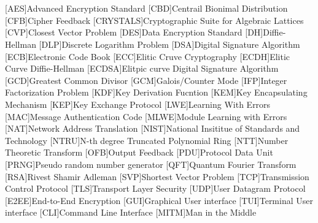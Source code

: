 \cleardoublepage
\chapter*{\listofabbrevname}
{}

\begin{acronym}[mmmmmmm]
	[AES]{Advanced Encryption Standard}
	[CBD]{Centrail Bionimal Distribution}
	[CFB]{Cipher Feedback}
	[CRYSTALS]{Cryptographic Suite for Algebraic Lattices}
	[CVP]{Closest Vector Problem}
	[DES]{Data Encryption Standard}
	[DH]{Diffie-Hellman}
	[DLP]{Discrete Logarithm Problem}
	[DSA]{Digital Signature Algorithm}
	[ECB]{Electronic Code Book}
	[ECC]{Elitic Cruve Cryptography}
	[ECDH]{Elitic Curve Diffie-Hellman}
	[ECDSA]{Elitpic curve Digital Signature Algorithm}
	[GCD]{Greatest Common Divisor}
	[GCM]{Galois/Counter Mode}
	[IFP]{Integer Factorization Problem}
	[KDF]{Key Derivation Fucntion}
	[KEM]{Key Encapsulating Mechanism}
	[KEP]{Key Exchange Protocol}
	[LWE]{Learning With Errors}
	[MAC]{Message Authentication Code}
	[MLWE]{Module Learning with Errors}
	[NAT]{Network Address Translation}
	[NIST]{National Insititue of Standards and Technology}
	[NTRU]{N-th degree Truncated Polynomial Ring}
	[NTT]{Number Theoretic Transform}
	[OFB]{Output Feedback}
	[PDU]{Protocol Data Unit}
	[PRNG]{Pseudo random number generator}
	[QFT]{Quantum Fourier Transform}
	[RSA]{Rivest Shamir Adleman}
	[SVP]{Shortest Vector Problem}
	[TCP]{Transmission Control Protocol}
	[TLS]{Transport Layer Security}
	[UDP]{User Datagram Protocol}
	[E2EE]{End-to-End Encryption}
	[GUI]{Graphical User interface}
	[TUI]{Terminal User interface}
	[CLI]{Command Line Interface}
	[MITM]{Man in the Middle}
\end{acronym}
